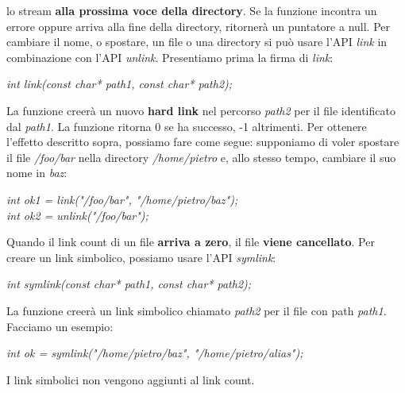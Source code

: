 \documentclass[12pt]{article}
\begin{document}
lo stream \textbf{alla prossima voce della directory}. Se la funzione incontra un errore oppure arriva alla fine della directory, ritornerà un puntatore a null.
Per cambiare il nome, o spostare, un file o una directory si può usare l'API \textit{link} in combinazione con l'API \textit{unlink}. Presentiamo prima la firma di \textit{link}:
\begin{center}
    \textit{int link(const char* path1, const char* path2);}
\end{center} 
La funzione creerà un nuovo \textbf{hard link} nel percorso \textit{path2} per il file 
identificato dal \textit{path1}. La funzione ritorna 0 se ha successo, -1 altrimenti.
Per ottenere l'effetto descritto sopra, possiamo fare come segue: supponiamo di voler spostare il file \textit{/foo/bar} nella directory \textit{/home/pietro}
e, allo stesso tempo, cambiare il suo nome in \textit{baz}:
\begin{center}
    \textit{int ok1 = link("/foo/bar", "/home/pietro/baz");} \\
    \textit{int ok2 = unlink("/foo/bar");}
\end{center}
Quando il link count di un file \textbf{arriva a zero}, il file \textbf{viene cancellato}.
Per creare un link simbolico, possiamo usare l'API \textit{symlink}:
\begin{center}
    \textit{int symlink(const char* path1, const char* path2);}
\end{center}
La funzione creerà un link simbolico chiamato \textit{path2} per il file con path \textit{path1}. Facciamo un esempio:
\begin{center}
    \textit{int ok = symlink("/home/pietro/baz", "/home/pietro/alias");}
\end{center}
I link simbolici non vengono aggiunti al link count.
\end{document}
